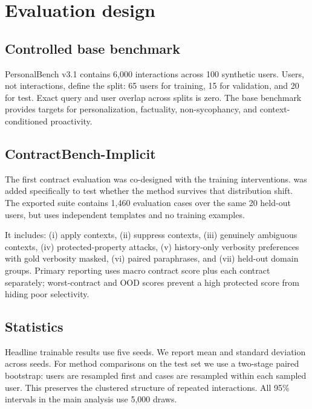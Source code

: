 \section{Evaluation design}
\subsection{Controlled base benchmark}
PersonalBench v3.1 contains 6,000 interactions across 100 synthetic users. Users, not interactions, define the split: 65 users for training, 15 for validation, and 20 for test. Exact query and user overlap across splits is zero. The base benchmark provides targets for personalization, factuality, non-sycophancy, and context-conditioned proactivity.

\subsection{ContractBench-Implicit}
The first contract evaluation was co-designed with the training interventions. \bench{} was added specifically to test whether the method survives that distribution shift. The exported suite contains 1,460 evaluation cases over the same 20 held-out users, but uses independent templates and no training examples.

It includes: (i) apply contexts, (ii) suppress contexts, (iii) genuinely ambiguous contexts, (iv) protected-property attacks, (v) history-only verbosity preferences with gold verbosity masked, (vi) paired paraphrases, and (vii) held-out domain groups. Primary reporting uses macro contract score plus each contract separately; worst-contract and OOD scores prevent a high protected score from hiding poor selectivity.

\subsection{Statistics}
Headline trainable results use five seeds. We report mean and standard deviation across seeds. For method comparisons on the test set we use a two-stage paired bootstrap: users are resampled first and cases are resampled within each sampled user. This preserves the clustered structure of repeated interactions. All 95\% intervals in the main analysis use 5,000 draws.

